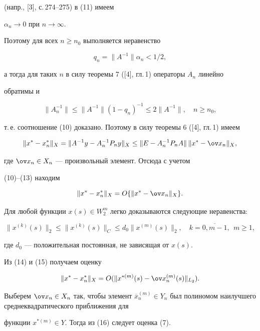 \begin{pf}
(напр., [3], с.\,274--275) в (11) имеем


$\alpha_n \to 0$ при $n \to \infty$.


Поэтому для всех $n \geq n_0$ выполняется неравенство


$$


q_n=\| A^{-1} \| \alpha_n < 1/2 ,


$$


а тогда для таких $n$ в силу теоремы 7 ([4], гл.\,1) операторы $A_n$ линейно


обратимы и


$$


\| A_n^{-1} \| \leq \| A^{-1} \| (1-q_n)^{-1}


\leq 2 \| A^{-1} \|, \quad n \geq n_{0},


$$


т.\,е. соотношение (10) доказано. Поэтому в силу теоремы 6 ([4], гл.\,1) имеем


$$


\| x^* - x_n^* \|_X=\| A^{-1}y - A_n^{-1}P_ny


\|_X \leq \| E-A_n^{-1}P_nA \|\, \| x^* - \ov x_n \|_X,


$$


где $\ov x_n \in X_n$ --- произвольный элемент. Отсюда с учетом


(10)--(13) находим


\begin{equation}


\| x^* - x_n^* \|_X=O \lbrace \| x^* - \ov x_n\|_X \rbrace.


\end{equation}





Для любой функции $x(s) \in W_2^m$ легко доказываются следующие неравенства:


\begin{equation}


\| x^{(k)}(s) \|_{2} \leq \| x^{(k)}(s) \|_{C} \leq


d_0 \| x^{(m)}(s) \|_{2}, \quad k=\overline{0,m-1}, \ \ m \geq 1,


\end{equation}


где $d_0$ --- положительная постоянная, не зависящая от $x(s)$.


Из (14) и (15) получаем оценку


\begin{equation}


\| x^* - x_n^* \|_X=O( \| x^{*(m)}(s) - \ov x_n^{(m)}(s)


\|_{L_2}).


\end{equation}





Выберем $\ov x_n \in X_n$ так, чтобы элемент $\overline x_n^{(m)}


\in Y_n$ был полиномом наилучшего среднеквадратического приближения для


функции $x^{*(m)}\in Y$. Тогда из (16) следует оценка (7).


\end{pf}
